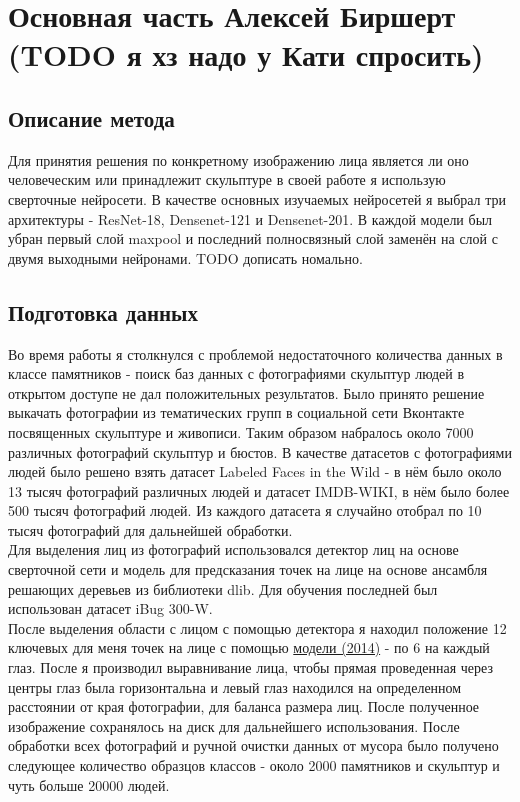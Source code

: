 \documentclass[a4paper,14pt]{extarticle}
\newcommand{\bibref}[3]{\hyperlink{#1}{#2 (#3)}} %
\begin{document}
    \section{Основная часть Алексей Биршерт (TODO я хз надо у Кати спросить)}

    \subsection{Описание метода}
    Для принятия решения по конкретному изображению лица является ли оно человеческим или принадлежит скульптуре в своей работе я использую сверточные нейросети. В качестве основных изучаемых нейросетей я выбрал три архитектуры - ResNet-18, Densenet-121 и Densenet-201. В каждой модели был убран первый слой maxpool и последний полносвязный слой заменён на слой с двумя выходными нейронами. TODO дописать номально.

    \subsection{Подготовка данных}
    Во время работы я столкнулся с проблемой недостаточного количества данных в классе памятников - поиск баз данных с фотографиями скульптур людей в открытом доступе не дал положительных результатов. Было принято решение выкачать фотографии из тематических групп в социальной сети Вконтакте посвященных скульптуре и живописи. Таким образом набралось около 7000 различных фотографий скульптур и бюстов. В качестве датасетов с фотографиями людей было решено взять датасет Labeled Faces in the Wild - в нём было около 13 тысяч фотографий различных людей и датасет IMDB-WIKI, в нём было более 500 тысяч фотографий людей. Из каждого датасета я случайно отобрал по 10 тысяч фотографий для дальнейшей обработки. \\
    Для выделения лиц из фотографий использовался детектор лиц на основе сверточной сети и модель для предсказания точек на лице на основе ансамбля решающих деревьев из библиотеки dlib. Для обучения последней был использован датасет iBug 300-W. \\
    После выделения области с лицом с помощью детектора я находил положение 12 ключевых для меня точек на лице с помощью \bibref{align}{модели}{2014} - по 6 на каждый глаз. После я производил выравнивание лица, чтобы прямая проведенная через центры глаз была горизонтальна и левый глаз находился на определенном расстоянии от края фотографии, для баланса размера лиц. После полученное изображение сохранялось на диск для дальнейшего использования. После обработки всех фотографий и ручной очистки данных от мусора было получено следующее количество образцов классов - около 2000 памятников и скульптур и чуть больше 20000 людей.
\end{document}
